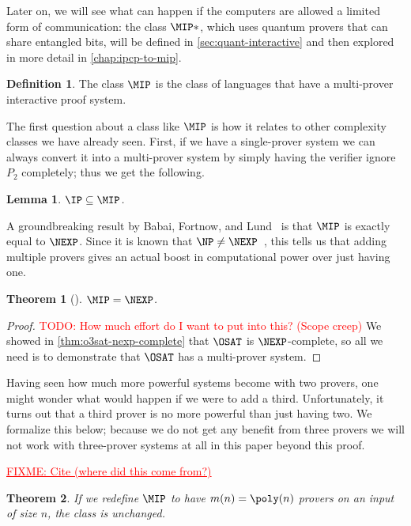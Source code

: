 \documentclass[english,12pt]{reedthesis}
\theoremstyle{plain}
\newtheorem{thm}{Theorem}[section]
\newtheorem{lemma}[lemma]{Lemma}
\theoremstyle{definition}
\newtheorem{defn}[defn]{Definition}
\theoremstyle{remark}
\newcommand{\TODO}[1]{\textcolor{red}{TODO: #1}}
\newcommand{\FIXME}[1]{\textcolor{red}{\ul{FIXME: #1}}}
\begin{document}
Later on, we will see what can happen if the computers are allowed a limited
form of communication: the class $\MIP*$, which uses quantum provers that can
share entangled bits, will be defined in \cref{sec:quant-interactive} and then
explored in more detail in \cref{chap:ipcp-to-mip}.

\begin{defn}\label{def:mip}
  The class $\MIP$ is the class of languages that have a multi-prover
  interactive proof system.
\end{defn}

The first question about a class like $\MIP$ is how it relates to other
complexity classes we have already seen. First, if we have a single-prover
system we can always convert it into a multi-prover system by simply having the
verifier ignore $P_{2}$ completely; thus we get the following.

\begin{lemma}\label{lem:ip-in-mip}
  $\IP \subseteq \MIP$.
\end{lemma}

A groundbreaking result by Babai, Fortnow, and Lund~\cite{BFL90} is that $\MIP$
is exactly equal to $\NEXP$. Since it is known that $\NP \ne \NEXP$~\cite{Cook73},
this tells us that adding multiple provers gives an actual boost in
computational power over just having one.

\begin{thm}[{\cite{BFL90}}]\label{thm:mip-is-nexp}
  $\MIP = \NEXP$.
\end{thm}

\begin{proof}
  \TODO{How much effort do I want to put into this? (Scope creep)}
  We showed in \cref{thm:o3sat-nexp-complete} that $\OSAT$ is $\NEXP$-complete,
  so all we need is to demonstrate that $\OSAT$ has a multi-prover system.
\end{proof}

Having seen how much more powerful systems become with two provers, one might
wonder what would happen if we were to add a third. Unfortunately, it turns out
that a third prover is no more powerful than just having two. We formalize this
below; because we do not get any benefit from three provers we will not work
with three-prover systems at all in this paper beyond this proof.

\FIXME{Cite (where did this come from?)}
\begin{thm}\label{thm:mip-unchanged}
  If we redefine $\MIP$ to have $m(n) = \poly(n)$ provers on an input of size
  $n$, the class is unchanged.
\end{thm}
\end{document}
